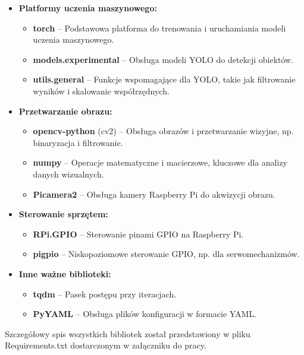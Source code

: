 \documentclass[a4paper,twoside,12pt]{book}
\begin{document}
\begin{itemize}
    \item \textbf{Platformy uczenia maszynowego:}
    \begin{itemize}
        \item \textbf{torch} – Podstawowa platforma do trenowania i uruchamiania modeli uczenia maszynowego.
        \item \textbf{models.experimental} – Obsługa modeli YOLO do detekcji obiektów.
        \item \textbf{utils.general} – Funkcje wspomagające dla YOLO, takie jak filtrowanie wyników i skalowanie współrzędnych.
    \end{itemize}
    
    \item \textbf{Przetwarzanie obrazu:}
    \begin{itemize}
        \item \textbf{opencv-python} (cv2) – Obsługa obrazów i przetwarzanie wizyjne, np. binaryzacja i filtrowanie.
        \item \textbf{numpy} – Operacje matematyczne i macierzowe, kluczowe dla analizy danych wizualnych.
        \item \textbf{Picamera2} – Obsługa kamery Raspberry Pi do akwizycji obrazu.
    \end{itemize}
    
    \item \textbf{Sterowanie sprzętem:}
    \begin{itemize}
        \item \textbf{RPi.GPIO} – Sterowanie pinami GPIO na Raspberry Pi.
        \item \textbf{pigpio} – Niskopoziomowe sterowanie GPIO, np. dla serwomechanizmów.
    \end{itemize}
    
    \item \textbf{Inne ważne biblioteki:}
    \begin{itemize}
        \item \textbf{tqdm} – Pasek postępu przy iteracjach.
        \item \textbf{PyYAML} – Obsługa plików konfiguracji w formacie YAML.
    \end{itemize}
\end{itemize}

Szczegółowy spis wszystkich bibliotek został przedstawiony w pliku Requirements.txt dostarczonym w załączniku do pracy.
\end{document}
